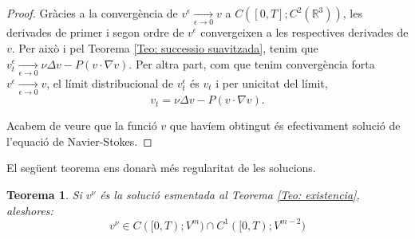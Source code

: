 \documentclass{article}
\numberwithin{equation}{section}
\newtheorem{teorema}{Teorema}[section]
\begin{document}
\begin{proof}
Gr\`{a}cies a la converg\`{e}ncia de $v^{\epsilon}\xrightarrow[\epsilon\to0]{}v$ a $C([0,T];C^2(\mathbb{R}^3))$, les derivades de primer i segon ordre de $v^{\epsilon}$ convergeixen a les respectives derivades de $v$. Per aix\`{o} i pel Teorema \ref{Teo: successio suavitzada}, tenim que $v_t^{\epsilon}\xrightarrow[\epsilon\to0]{}\nu\Delta v-P(v\cdot\nabla v)$. Per altra part, com que tenim converg\`{e}ncia forta $v^{\epsilon}\xrightarrow[\epsilon\to0]{}v$, el l\'{i}mit distribucional de $v_t^{\epsilon}$ \'{e}s $v_t$ i per unicitat del l\'{i}mit,
\[v_t=\nu\Delta v-P(v\cdot\nabla v).\]

Acabem de veure que la funci\'{o} $v$ que hav\'{i}em obtingut \'{e}s efectivament soluci\'{o} de l'equaci\'{o} de Navier-Stokes.
\end{proof}

El seg\"{u}ent teorema ens donar\`{a} m\'{e}s regularitat de les solucions.

\begin{teorema}
Si $v^{\nu}$ \'{e}s la soluci\'{o} esmentada al Teorema \ref{Teo: existencia}, aleshores:
\[v^{\nu}\in C([0,T);V^m)\cap C^1([0,T);V^{m-2})\]
\end{teorema}
\end{document}
